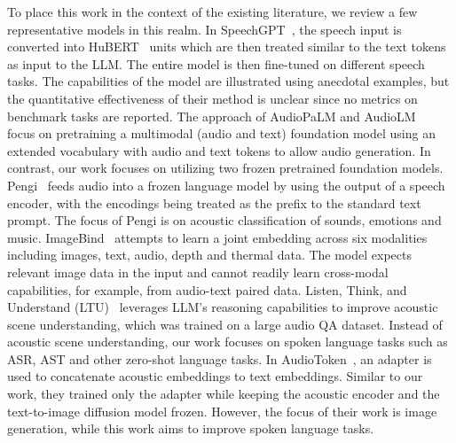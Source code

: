 To place this work in the context of the existing literature, we review a few representative models in this realm.
In SpeechGPT~\cite{zhang2023speechgpt}, the speech input is converted into HuBERT~\cite{hsu2021hubert} units which are then treated similar to the text tokens as input to the LLM. The entire model is then fine-tuned on different speech tasks. The capabilities of the model are illustrated using anecdotal examples, but the quantitative effectiveness of their method is unclear since no metrics on benchmark tasks are reported.
The approach of AudioPaLM and AudioLM ~\cite{rubenstein2023audiopalm, borsos2023audiolm} focus on pretraining a multimodal (audio and text) foundation model using an extended vocabulary with audio and text tokens to allow audio generation. In contrast, our work focuses on utilizing two frozen pretrained foundation models.
Pengi~\cite{deshmukh2023pengi} feeds audio into a frozen language model by using the output of a speech encoder, with the encodings being treated as the prefix to the standard text prompt. The focus of Pengi is on acoustic classification of sounds, emotions and music. 
ImageBind~\cite{girdhar2023imagebind} attempts to learn a joint embedding across six modalities including images, text, audio, depth and thermal data. The model expects relevant image data in the input and cannot readily learn cross-modal capabilities, for example, from audio-text paired data. 
Listen, Think, and Understand (LTU)~\cite{gong2023listen} leverages LLM's reasoning capabilities to improve acoustic scene understanding, which was trained on a large audio QA dataset. Instead of acoustic scene understanding, our work focuses on spoken language tasks such as ASR, AST and other zero-shot language tasks.
In AudioToken~\cite{yariv2023audiotoken}, an adapter is used to concatenate acoustic embeddings to text embeddings. Similar to our work, they trained only the adapter while keeping the acoustic encoder and the text-to-image diffusion model frozen. However, the focus of their work is image generation, while this work aims to improve spoken language tasks.
